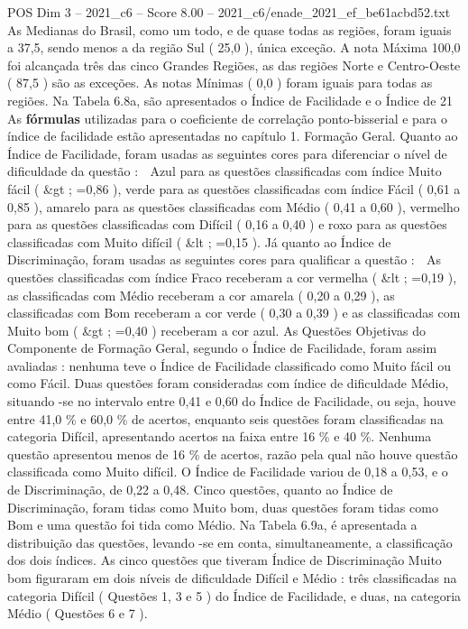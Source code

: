 \begin{textsample}{POS Dim 3 – 2021\_c6 – Score 8.00 – 2021\_c6/enade\_2021\_ef\_be61acbd52.txt}
As Medianas do Brasil, como um todo, e de quase todas as regiões, foram iguais a 37,5, sendo menos a da região Sul ( 25,0 ), única exceção.
A nota Máxima 100,0 foi alcançada três das cinco Grandes Regiões, as das regiões Norte e Centro-Oeste ( 87,5 ) são as exceções.
As notas Mínimas ( 0,0 ) foram iguais para todas as regiões.
Na Tabela 6.8a, são apresentados o Índice de Facilidade e o Índice de 21 As \textbf{fórmulas} utilizadas para o coeficiente de correlação ponto-bisserial e para o índice de facilidade estão apresentadas no capítulo 1.
Formação Geral.
Quanto ao Índice de Facilidade, foram usadas as seguintes cores para diferenciar o nível de dificuldade da questão :  Azul para as questões classificadas com índice Muito fácil ( \&gt ; =0,86 ), verde para as questões classificadas com índice Fácil ( 0,61 a 0,85 ), amarelo para as questões classificadas com Médio ( 0,41 a 0,60 ), vermelho para as questões classificadas com Difícil ( 0,16 a 0,40 ) e roxo para as questões classificadas com Muito difícil ( \&lt ; =0,15 ).
Já quanto ao Índice de Discriminação, foram usadas as seguintes cores para qualificar a questão :  As questões classificadas com índice Fraco receberam a cor vermelha ( \&lt ; =0,19 ), as classificadas com Médio receberam a cor amarela ( 0,20 a 0,29 ), as classificadas com Bom receberam a cor verde ( 0,30 a 0,39 ) e as classificadas com Muito bom ( \&gt ; =0,40 ) receberam a cor azul.
As Questões Objetivas do Componente de Formação Geral, segundo o Índice de Facilidade, foram assim avaliadas : nenhuma teve o Índice de Facilidade classificado como Muito fácil ou como Fácil.
Duas questões foram consideradas com índice de dificuldade Médio, situando -se no intervalo entre 0,41 e 0,60 do Índice de Facilidade, ou seja, houve entre 41,0 \% e 60,0 \% de acertos, enquanto seis questões foram classificadas na categoria Difícil, apresentando acertos na faixa entre 16 \% e 40 \%.
Nenhuma questão apresentou menos de 16 \% de acertos, razão pela qual não houve questão classificada como Muito difícil.
O Índice de Facilidade variou de 0,18 a 0,53, e o de Discriminação, de 0,22 a 0,48.
Cinco questões, quanto ao Índice de Discriminação, foram tidas como Muito bom, duas questões foram tidas como Bom e uma questão foi tida como Médio.
Na Tabela 6.9a, é apresentada a distribuição das questões, levando -se em conta, simultaneamente, a classificação dos dois índices.
As cinco questões que tiveram Índice de Discriminação Muito bom figuraram em dois níveis de dificuldade Difícil e Médio : três classificadas na categoria Difícil ( Questões 1, 3 e 5 ) do Índice de Facilidade, e duas, na categoria Médio ( Questões 6 e 7 ).

\end{textsample}
